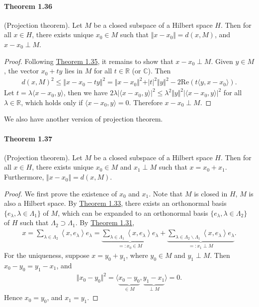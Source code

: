 \documentclass{article}
\renewcommand{\Re}{\mathrm{Re}}
\begin{document}
\paragraph{Theorem 1.36\label{thm:1.36}} (Projection theorem). Let $M$ be a closed subspace of a Hilbert space $H$. Then for all $x\in H$, there exists unique $x_0\in M$ such that $\Vert x-x_0\Vert = d(x,M)$, and $x-x_0\perp M$.
\begin{proof}
Following \hyperref[thm:1.35]{Theorem 1.35}, it remains to show that $x-x_0\perp M$. Given $y\in M$, the vector $x_0+ty$ lies in $M$ for all $t\in\mathbb{R}$ (or $\mathbb{C}$). Then
\begin{align*}
	d(x,M)^2 \leq \Vert x-x_0 - ty\Vert^2 = \Vert x-x_0\Vert^2 + \vert t\vert^2\Vert y\Vert^2 - 2\Re\left(t\langle y,x-x_0\rangle\right).
\end{align*}
Let $t=\lambda\langle x-x_0,y\rangle$, then we have $2\lambda\left\vert\langle x-x_0,y\rangle\right\vert^2\leq\lambda^2\Vert y\Vert^2\left\vert\langle x-x_0,y\rangle\right\vert^2$ for all $\lambda\in\mathbb{R}$, which holds only if $\langle x-x_0,y\rangle=0$. Therefore $x-x_0\perp M$.
\end{proof}

We also have another version of projection theorem.

\paragraph{Theorem 1.37\label{thm:1.37}} (Projection theorem). Let $M$ be a closed subspace of a Hilbert space $H$. Then for all $x\in H$, there exists unique $x_0\in M$ and $x_1\perp M$ such that $x=x_0+x_1$. Furthermore, $\Vert x-x_0\Vert = d(x,M)$.
\begin{proof}
We first prove the existence of $x_0$ and $x_1$. Note that $M$ is closed in $H$, $M$ is also a Hilbert space. By \hyperref[thm:1.33]{Theorem 1.33}, there exists an orthonormal basis $\{e_\lambda,\lambda\in\Lambda_1\}$ of $M$, which can be expanded to an orthonormal basis $\{e_\lambda,\lambda\in\Lambda_2\}$ of $H$ such that $\Lambda_2\supset\Lambda_1$. By \hyperref[thm:1.31]{Theorem 1.31},
\begin{align*}
	x = \sum_{\lambda\in\Lambda_2}\left\langle x,e_\lambda\right\rangle e_\lambda = \underbrace{\sum_{\lambda\in\Lambda_1}\left\langle x,e_\lambda\right\rangle e_\lambda}_{=:x_0\in M} + \underbrace{\sum_{\lambda\in\Lambda_2\backslash\Lambda_1}\left\langle x,e_\lambda\right\rangle e_\lambda}_{=:x_1\perp M}.
\end{align*}
For the uniqueness, suppose $x=y_0+y_1$, where $y_0\in M$ and $y_1\perp M$. Then $x_0 - y_0 = y_1 - x_1$, and
\begin{align*}
	\Vert x_0 - y_0\Vert^2 = \langle \underbrace{x_0 - y_0}_{\in M},\underbrace{y_1 - x_1}_{\perp M}\rangle = 0.
\end{align*}
Hence $x_0=y_0$, and $x_1=y_1$.
\end{proof}
\end{document}

